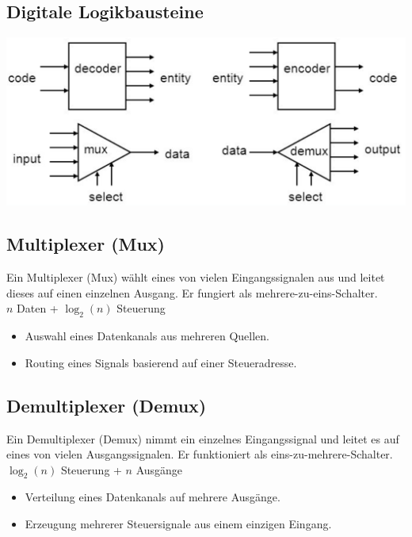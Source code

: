\documentclass[a4paper,6pt]{article}
\begin{document}
\begin{multicols*}{3}
\section*{Digitale Logikbausteine}

\begin{center}
    \includegraphics[width=1\linewidth]{resources/Logikbausteine.png}
\end{center}
    

\subsection*{Multiplexer (Mux)}
Ein Multiplexer (Mux) wählt eines von vielen Eingangssignalen aus und leitet dieses auf einen einzelnen Ausgang. Er fungiert als mehrere-zu-eins-Schalter.\\
$ n $ Daten + $ \log_2(n) $ Steuerung
\begin{itemize}
    \item Auswahl eines Datenkanals aus mehreren Quellen.
    \item Routing eines Signals basierend auf einer Steueradresse.
\end{itemize}

\subsection*{Demultiplexer (Demux)}
Ein Demultiplexer (Demux) nimmt ein einzelnes Eingangssignal und leitet es auf eines von vielen Ausgangssignalen. Er funktioniert als eins-zu-mehrere-Schalter.\\
$ \log_2(n) $ Steuerung + $ n $ Ausgänge
\begin{itemize}
    \item Verteilung eines Datenkanals auf mehrere Ausgänge.
    \item Erzeugung mehrerer Steuersignale aus einem einzigen Eingang.
\end{itemize}


\end{multicols*}
\end{document}
